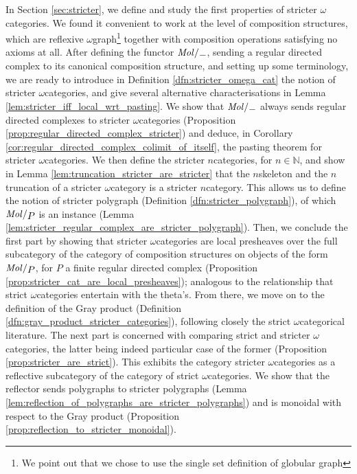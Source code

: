 In Section \ref{sec:stricter}, we define and study the first properties of stricter \( \omega \)\nbd categories.
We found it convenient to work at the level of composition structures, which are reflexive \( \omega \)\nbd graph\footnote{We point out that we chose to use the single set definition of globular graph} together with composition operations satisfying no axioms at all.
After defining the functor \( \molecin{-} \), sending a regular directed complex to its canonical composition structure, and setting up some terminology, we are ready to introduce in Definition \ref{dfn:stricter_omega_cat} the notion of stricter \( \omega \)\nbd categories, and give several alternative characterisations in Lemma \ref{lem:stricter_iff_local_wrt_pasting}.
We show that \( \molecin{-} \) always sends regular directed complexes to stricter \( \omega \)\nbd categories (Proposition \ref{prop:regular_directed_complex_stricter}) and deduce, in Corollary \ref{cor:regular_directed_complex_colimit_of_itself}, the pasting theorem for stricter \( \omega \)\nbd categories.
We then define the stricter \( n \)\nbd categories, for \( n \in \mathbb{N} \), and show in Lemma \ref{lem:truncation_stricter_are_stricter} that the \( n \)\nbd skeleton and the \( n \)\nbd truncation of a stricter \( \omega \)\nbd category is a stricter \( n \)\nbd category.
This allows us to define the notion of stricter polygraph (Definition \ref{dfn:stricter_polygraph}), of which \( \molecin{P} \) is an instance (Lemma \ref{lem:stricter_regular_complex_are_stricter_polygraph}).
Then, we conclude the first part by showing that stricter \( \omega \)\nbd categories are local presheaves over the full subcategory of the category of composition structures on objects of the form \( \molecin{P} \), for \( P \) a finite regular directed complex (Proposition \ref{prop:stricter_cat_are_local_presheaves}); analogous to the relationship that strict \( \omega \)\nbd categories entertain with the theta's.
From there, we move on to the definition of the Gray product (Definition \ref{dfn:gray_product_stricter_categories}), following closely the strict \( \omega \)\nbd categorical literature.
The next part is concerned with comparing strict and stricter \( \omega \)\nbd categories, the latter being indeed particular case of the former (Proposition \ref{prop:stricter_are_strict}).
This exhibits the category stricter \( \omega \)\nbd categories as a reflective subcategory of the category of strict \( \omega \)\nbd categories.
We show that the reflector sends polygraphs to stricter polygraphs (Lemma \ref{lem:reflection_of_polygraphs_are_stricter_polygraphs}) and is monoidal with respect to the Gray product (Proposition \ref{prop:reflection_to_stricter_monoidal}).
